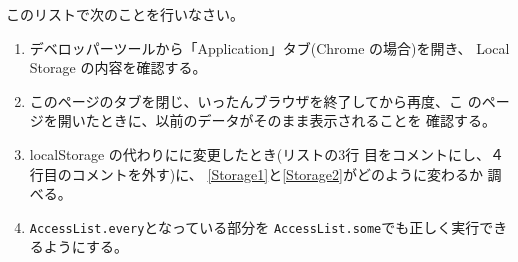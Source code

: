  \begin{Prob}\upshape\Must
	このリストで次のことを行いなさい。
	\begin{enumerate}
	 \item デベロッパーツールから「Application」タブ(Chrome の場合)を開き、
				 Local Storage の内容を確認する。\label{Storage1}
	 \item このページのタブを閉じ、いったんブラウザを終了してから再度、こ
				 のページを開いたときに、以前のデータがそのまま表示されることを
				 確認する。\label{Storage2}
	 \item localStorage の代わりにに変更したとき(リストの3行
				 目をコメントにし、４行目のコメントを外す)に、
				 \ref{Storage1}と\ref{Storage2}がどのように変わるか
				 調べる。
	 \item \Verb+AccessList.every+となっている部分を
	\Verb+AccessList.some+でも正しく実行できるようにする。
	\end{enumerate}
\end{Prob}
